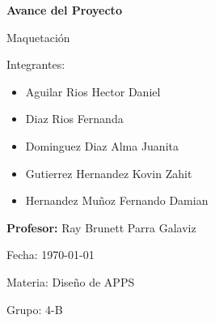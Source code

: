 \documentclass{article}
\begin{document}
	
	\begin{titlepage}
	\centering
	
	\vspace*{\fill}
	
	\Huge\textbf{Avance del Proyecto}
	
	\vspace{1cm}
	
	\Large Maquetación
	
	\vspace{2cm}
	
	\LARGE Integrantes:
	
	\begin{itemize}
		\item Aguilar Rios Hector Daniel
		\item Diaz Rios Fernanda
		\item Dominguez Diaz Alma Juanita
		\item Gutierrez Hernandez Kovin Zahit
		\item Hernandez Muñoz Fernando Damian
		
	\end{itemize}
	
	\vspace{2cm}
	
	\Large \textbf{Profesor:} Ray Brunett Parra Galaviz
	
	\vspace{1cm}
	
	\Large Fecha: \today 
	
	\vspace{1cm}
	
	\Large Materia: Diseño de APPS
	
	\vspace{1cm}
	
	\Large Grupo: 4-B
	
	\vspace*{\fill}
\end{titlepage}
	
	
	
	
	
\end{document}
